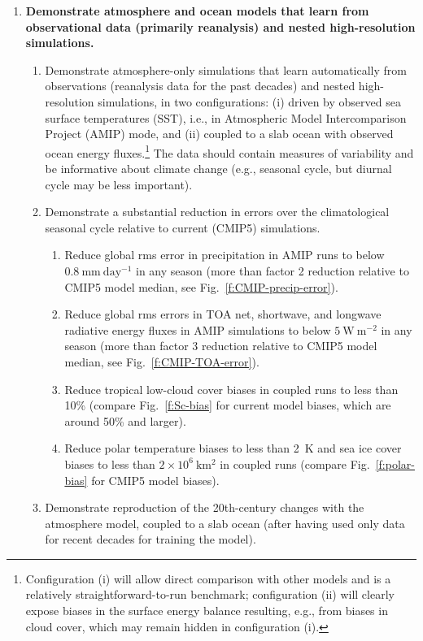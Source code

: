 \documentclass{article}
\begin{document}
\begin{enumerate}
    \item \textbf{Demonstrate atmosphere and ocean models that learn from observational data (primarily reanalysis) and nested high-resolution simulations.}
    
    \begin{enumerate}
        \item Demonstrate atmosphere-only simulations that learn automatically from observations (reanalysis data for the past decades) and nested high-resolution simulations, in two configurations: (i) driven by observed sea surface temperatures (SST), i.e., in Atmospheric Model Intercomparison Project (AMIP) mode, and (ii) coupled to a slab ocean with observed ocean energy fluxes.\footnote{Configuration (i) will allow direct comparison with other models and is a relatively straightforward-to-run benchmark; configuration (ii) will clearly expose biases in the surface energy balance resulting, e.g., from biases in cloud cover, which may remain hidden in configuration (i).} The data should contain measures of variability and be informative about climate change (e.g., seasonal cycle, but diurnal cycle may be less important).
        \item Demonstrate a substantial reduction in errors over the climatological seasonal cycle relative to current (CMIP5) simulations. 
        \begin{enumerate}
            \item Reduce global rms error in precipitation in AMIP runs to below $0.8~\mathrm{mm~day^{-1}}$ in any season (more than factor 2 reduction relative to CMIP5 model median, see Fig.~\ref{f:CMIP-precip-error}).
            \item Reduce global rms errors in TOA net, shortwave, and longwave radiative energy fluxes in AMIP simulations to below $5~\mathrm{W~m^{-2}}$ in any season (more than factor 3 reduction relative to CMIP5 model median, see Fig.~\ref{f:CMIP-TOA-error}).
            \item Reduce tropical low-cloud cover biases in coupled runs to less than 10\% (compare Fig.~\ref{f:Sc-bias} for current model biases, which are around 50\% and larger).
            \item Reduce polar temperature biases to less than 2~K and sea ice cover biases to less than $2\times 10^6~\mathrm{km^2}$ in coupled runs (compare Fig.~\ref{f:polar-bias} for CMIP5 model biases).
             \end{enumerate}
                \item Demonstrate reproduction of the 20th-century changes with the atmosphere model, coupled to a slab ocean (after having used only data for recent decades for training the model).

\end{enumerate}
\end{enumerate}
\end{document}
